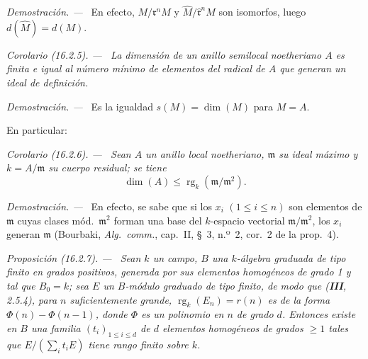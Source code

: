 \documentclass[10pt,oneside]{book}
\makeatletter
\newcommand{\setmanualcurrentlabel}[1]{\def\@currentlabel{#1}}
\newcommand{\oldpage}[2][]{%
  \setcounter{footnote}{0}%
  \marginpar{\scriptsize\textbf{#1}~|~#2}\ignorespaces}
\newenvironment{proposition}[1][]{%
  \setmanualcurrentlabel{#1}\par\medskip\noindent\itshape Proposición (#1). ---\ }{\par}
\newenvironment{corollary}[1][]{%
  \setmanualcurrentlabel{#1}\par\medskip\noindent\itshape Corolario (#1). ---\ }{\par}
\newenvironment{proof}{%
  \par\medskip\noindent\textit{Demostración. ---\ }}{\par}
\providecommand{\setmin}{-}%
\makeatother
\begin{document}
\oldpage[0\textsubscript{IV-1}]{28}

\begin{proof}
En efecto, $M/\mathfrak{r}^nM$ y
$\widehat{M}/\widehat{\mathfrak{r}}^n\widehat{M}$ son isomorfos, luego
$d(\widehat{M})=d(M)$.
\end{proof}

\begin{corollary}[16.2.5]
\label{0.16.2.5-es}
La dimensión de un anillo semilocal noetheriano $A$ es finita e igual al número
mínimo de elementos del radical de $A$ que generan un ideal de definición.
\end{corollary}

\begin{proof}
Es la igualdad $s(M)=\dim(M)$ para $M=A$.
\end{proof}

En particular:

\begin{corollary}[16.2.6]
\label{0.16.2.6-es}
Sean $A$ un anillo local noetheriano, $\mathfrak{m}$ su ideal máximo y
$k=A/\mathfrak{m}$ su cuerpo residual; se tiene
\begin{equation}
\label{0.16.2.6.1-es}
\tag{16.2.6.1}
  \dim(A)\leq\operatorname{rg}_k(\mathfrak{m}/\mathfrak{m}^2).
\end{equation}
\end{corollary}

\begin{proof}
En efecto, se sabe que si los $x_i$ $(1\leq i\leq n)$ son elementos de
$\mathfrak{m}$ cuyas clases mód.~$\mathfrak{m}^2$ forman una base del
$k$-espacio vectorial $\mathfrak{m}/\mathfrak{m}^2$, los $x_i$ generan
$\mathfrak{m}$ (Bourbaki, \emph{Alg.~comm.}, cap.~II, \S~3, n.º~2, cor.~2 de
la prop.~4).
\end{proof}

\begin{proposition}[16.2.7]
\label{0.16.2.7-es}
Sean $k$ un campo, $B$ una $k$-álgebra graduada de tipo finito en grados
positivos, generada por sus elementos homogéneos de grado 1 y tal que $B_0=k$;
sea $E$ un $B$-módulo graduado de tipo finito, de modo que \textup{(\textbf{III}, 2.5.4)}, para
$n$ suficientemente grande, $\operatorname{rg}_k(E_n)=r(n)$ es de la forma
$\Phi(n)\setmin\Phi(n\setmin 1)$, donde $\Phi$ es un polinomio en $n$ de grado $d$. Entonces
existe en $B$ una familia $(t_i)_{1\leq i\leq d}$ de $d$ elementos homogéneos
de grados $\geq1$ tales que $E/(\sum_i t_iE)$ tiene rango finito sobre $k$.
\end{proposition}
\end{document}

